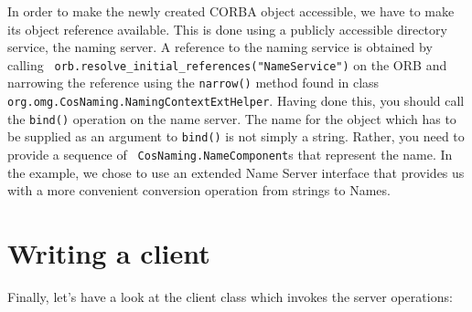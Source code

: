 \documentclass[12pt]{scrbook}
\begin{document}
In order to make the newly created CORBA object accessible, we have to
make its  object reference  available. This is  done using  a publicly
accessible directory  service, the naming  server. A reference  to the
naming      service     is      obtained      by     calling      {\tt
orb.resolve\_initial\_references("NameService")}   on   the  ORB   and
narrowing the reference using the {\tt narrow()} method found in class
{\tt org.omg.CosNaming.NamingContextExtHelper}.  Having done this, you
should call the  {\tt bind()} operation on the  name server.  The name
for the object which has to be supplied as an argument to {\tt bind()}
is not simply a string. Rather, you need to provide a sequence of {\tt
CosNaming.NameComponent}s that represent the  name. In the example, we
chose to use an extended Name Server interface that provides us with a
more convenient conversion operation from strings to Names.


\section{Writing a client}

Finally, let's have a look at the client class which invokes the
server operations:
\end{document}
